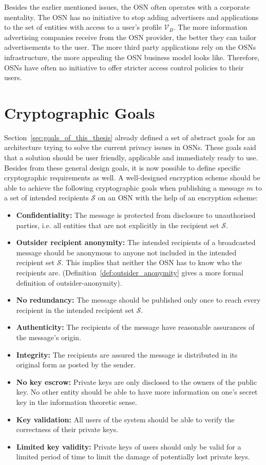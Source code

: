 Besides the earlier mentioned issues, the OSN often operates with a corporate mentality. The OSN has no initiative to stop adding advertisers and applications to the set of entities with access to a user's profile $\mathcal{V}_B$. The more information advertising companies receive from the OSN provider, the better they can tailor advertisements to the user. The more third party applications rely on the OSNs infrastructure, the more appealing the OSN business model looks like. Therefore, OSNs have often no initiative to offer stricter access control policies to their users.

\section{Cryptographic Goals}
\label{sec:cryptographic_goals}
Section~\ref{sec:goals_of_this_thesis} already defined a set of abstract goals for an architecture trying to solve the current privacy issues in OSNs. These goals said that a solution should be user friendly, applicable and immediately ready to use. Besides from these general design goals, it is now possible to define specific cryptographic requirements as well. A well-designed encryption scheme should be able to achieve the following cryptographic goals when publishing a message $m$ to a set of intended recipients $\mathcal{S}$ on an OSN with the help of an encryption scheme:
\begin{itemize}
 \item \textbf{Confidentiality:} The message is protected from disclosure to unauthorised parties, i.e. all entities that are not explicitly in the recipient set $\mathcal{S}$.
 \item \textbf{Outsider recipient anonymity:} The intended recipients of a broadcasted message should be anonymous to anyone not included in the intended recipient set $\mathcal{S}$. This implies that neither the OSN has to know who the recipients are. (Definition~\ref{def:outsider_anonymity} gives a more formal definition of outsider-anonymity).
 \item \textbf{No redundancy:} The message should be published only once to reach every recipient in the intended recipient set $\mathcal{S}$.
 \item \textbf{Authenticity:} The recipients of the message have reasonable assurances of the message's origin.
 \item \textbf{Integrity:} The recipients are assured the message is distributed in its original form as posted by the sender.
 \item \textbf{No key escrow:} Private keys are only disclosed to the owners of the public key. No other entity should be able to have more information on one's secret key in the information theoretic sense.
 \item \textbf{Key validation:} All users of the system should be able to verify the correctness of their private keys.
 \item \textbf{Limited key validity:} Private keys of users should only be valid for a limited period of time to limit the damage of potentially lost private keys.
\end{itemize}

